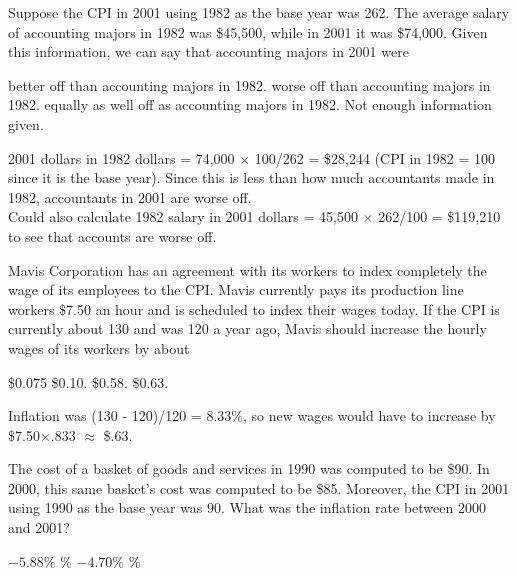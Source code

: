 \documentclass[addpoints,11pt]{exam}
\theoremstyle{definition}
\begin{document}
\begin{questions}
				
			\question Suppose the CPI in 2001 using 1982 as the base year was 262. The average salary of accounting majors in 1982 was \$45,500, while in 2001 it was \$74,000. Given this information, we can say that accounting majors in 2001 were
			
			\begin{choices}
				\choice better off than accounting majors in 1982.
				\CorrectChoice worse off than accounting majors in 1982.
				\choice equally as well off as accounting majors in 1982.
				\choice Not enough information given.
			\end{choices}
			
			\begin{solution}
				2001 dollars in 1982 dollars = 74,000 $\times$ 100/262 = \$28,244 (CPI in 1982 = 100 since it is the base year). Since this is less than how much accountants made in 1982, accountants in 2001 are worse off. \\
				Could also calculate 1982 salary in 2001 dollars = 45,500 $\times$ 262/100 = \$119,210 to see that accounts are worse off.
			\end{solution}
	
\newpage	
	
			\question Mavis Corporation has an agreement with its workers to index completely the wage of its employees to the CPI. Mavis currently pays its production line workers \$7.50 an hour and is scheduled to index their wages today. If the CPI is currently about 130 and was 120 a year ago, Mavis should increase the hourly wages of its workers by about
			
			\begin{choices}
				\choice \$0.075
				\choice  \$0.10.
				\choice \$0.58.
				\CorrectChoice \$0.63.
			\end{choices}
			
			\begin{solution}
				Inflation was (130 - 120)/120 = 8.33\%, so new wages would have to increase by \$7.50$\times$.833 $\approx$ \$.63.
			\end{solution}
			
			
			\question The cost of a basket of goods and services in 1990 was computed to be \$90. In 2000, this same basket's cost was computed to be \$85. Moreover, the CPI in 2001 using 1990 as the base year was 90. What was the inflation rate between 2000 and 2001?
			
			\begin{choices}
				\choice $-5.88\%$
				\choice 4.70\%
				\CorrectChoice $-4.70\%$
				\choice 5.88\%
			\end{choices}
			

\end{questions}
\end{document}
